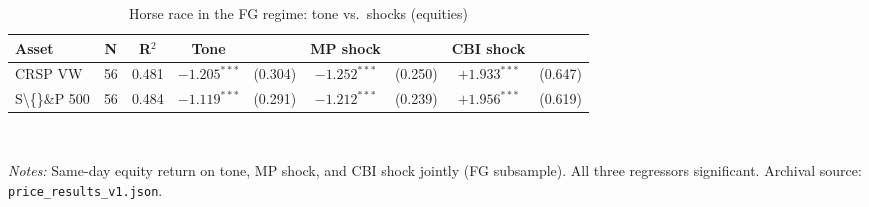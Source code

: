 \begin{table}[!tbp]
\centering\small
\caption{Horse race in the FG regime: tone vs.\ shocks (equities)}
\label{tab:42}
\begin{tabular}{lcccccccc}
\toprule
Asset & N & R$^2$ & Tone &  & MP shock &  & CBI shock &  \\
\midrule
CRSP VW & 56 & 0.481 & $-1.205^{***}$ & (0.304) & $-1.252^{***}$ & (0.250) & $+1.933^{***}$ & (0.647) \\
S\textbackslash\{\}\&P 500 & 56 & 0.484 & $-1.119^{***}$ & (0.291) & $-1.212^{***}$ & (0.239) & $+1.956^{***}$ & (0.619) \\
\bottomrule
\end{tabular}
\\[2pt]\begin{minipage}{0.92\linewidth}\footnotesize\emph{Notes:} Same-day equity return on tone, MP shock, and CBI shock jointly (FG subsample). All three regressors significant. Archival source: \texttt{price\_results\_v1.json}.\end{minipage}
\end{table}
